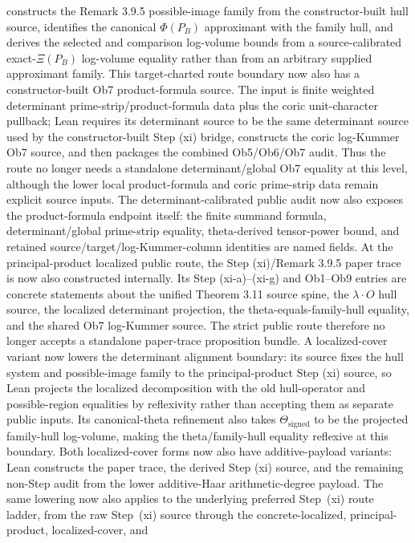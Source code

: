 \documentclass[11pt]{article}
\theoremstyle{plain}
\theoremstyle{definition}
\theoremstyle{remark}
\begin{document}
constructs the Remark 3.9.5 possible-image family from the constructor-built
hull source, identifies the canonical \(\Phi(P_B)\) approximant with the family
hull, and derives the selected and comparison log-volume bounds from a
source-calibrated exact-\(\Xi(P_B)\) log-volume equality rather than from an
arbitrary supplied approximant family.
This target-charted route boundary now also has a constructor-built Ob7
product-formula source.  The input is finite weighted determinant
prime-strip/product-formula data plus the coric unit-character pullback; Lean
requires its determinant source to be the same determinant source used by the
constructor-built Step (xi) bridge, constructs the coric log-Kummer Ob7 source,
and then packages the combined Ob5/Ob6/Ob7 audit.  Thus the route no longer
needs a standalone determinant/global Ob7 equality at this level, although the
lower local product-formula and coric prime-strip data remain explicit source
inputs.  The determinant-calibrated public audit now also exposes the product-formula
endpoint itself: the finite summand formula, determinant/global
prime-strip equality, theta-derived tensor-power bound, and retained
source/target/log-Kummer-column identities are named fields.
At the principal-product localized public route, the Step (xi)/Remark 3.9.5
paper trace is now also constructed internally.  Its Step (xi-a)--(xi-g) and
Ob1--Ob9 entries are concrete statements about the unified Theorem 3.11 source
spine, the \(\lambda\cdot O\) hull source, the localized determinant
projection, the theta-equals-family-hull equality, and the shared Ob7
log-Kummer source.  The strict public route therefore no longer accepts a
standalone paper-trace proposition bundle.  A localized-cover variant now
lowers the determinant alignment boundary: its source fixes the hull system and
possible-image family to the principal-product Step (xi) source, so Lean
projects the localized decomposition with the old hull-operator and
possible-region equalities by reflexivity rather than accepting them as
separate public inputs.  Its canonical-theta refinement also takes
\(\Theta_{\mathrm{signed}}\) to be the projected family-hull log-volume, making
the theta/family-hull equality reflexive at this boundary.  Both localized-cover
forms now also have additive-payload variants: Lean constructs the paper trace,
the derived Step (xi) source, and the remaining non-Step audit from the lower
additive-Haar arithmetic-degree payload.  The same lowering now also applies to
the underlying preferred Step~(xi) route ladder, from the raw Step~(xi) source
through the concrete-localized, principal-product, localized-cover, and
\end{document}
